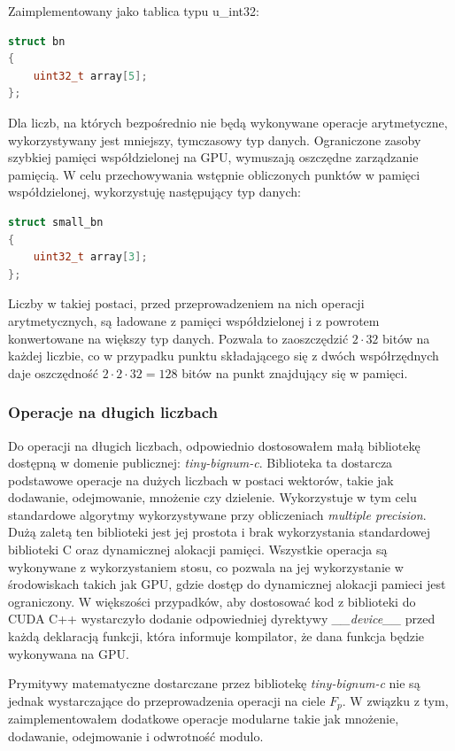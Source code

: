 Zaimplementowany jako tablica typu u\_int32:
\begin{lstlisting}[language=C++]
struct bn
{
    uint32_t array[5];
};
\end{lstlisting}
Dla liczb, na których bezpośrednio nie będą wykonywane operacje arytmetyczne, wykorzystywany jest mniejszy, tymczasowy typ
danych.
Ograniczone zasoby szybkiej pamięci współdzielonej na GPU, wymuszają oszczędne zarządzanie pamięcią. W celu
przechowywania wstępnie obliczonych punktów w pamięci współdzielonej, wykorzystuję następujący typ danych:
\begin{lstlisting}[language=C++]
struct small_bn
{
    uint32_t array[3];
};
\end{lstlisting}
\par
Liczby w takiej postaci, przed przeprowadzeniem na nich operacji arytmetycznych, są ładowane z pamięci współdzielonej i z powrotem konwertowane na większy typ danych.
Pozwala to zaoszczędzić $ 2 \cdot 32$ bitów na każdej liczbie, co w przypadku punktu składającego się z dwóch współrzędnych
daje oszczędność $2 \cdot 2 \cdot 32 = 128$ bitów na punkt znajdujący się w pamięci.

\subsubsection{Operacje na długich liczbach}
Do operacji na długich liczbach, odpowiednio dostosowałem małą bibliotekę
dostępną w domenie publicznej: \textit{tiny-bignum-c}.
Biblioteka ta dostarcza podstawowe operacje na dużych liczbach w postaci wektorów, takie jak dodawanie, odejmowanie, mnożenie czy dzielenie.
Wykorzystuje w tym celu standardowe algorytmy \cite{Menezes2001} wykorzystywane przy obliczeniach \textit{multiple precision}.
Dużą zaletą ten biblioteki jest jej prostota i brak wykorzystania standardowej biblioteki C oraz dynamicznej alokacji pamięci.
Wszystkie operacja są wykonywane z wykorzystaniem stosu,
co pozwala na jej wykorzystanie w środowiskach takich jak GPU, gdzie dostęp do dynamicznej alokacji pamieci jest ograniczony.
W większości przypadków, aby dostosować kod z biblioteki do CUDA C++ wystarczyło dodanie
odpowiedniej dyrektywy \textit{\_\_device\_\_} przed każdą deklaracją funkcji, która informuje kompilator, że dana funkcja
będzie wykonywana na GPU.
\par
Prymitywy matematyczne dostarczane przez bibliotekę \textit{tiny-bignum-c} nie są jednak wystarczające do przeprowadzenia
operacji na ciele $F_{p}$.
W związku z tym, zaimplementowałem dodatkowe operacje modularne takie jak mnożenie, dodawanie, odejmowanie i odwrotność modulo.

